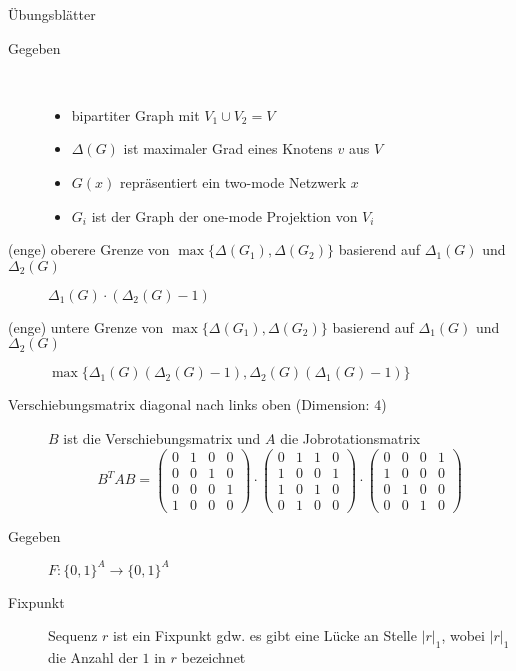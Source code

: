 \begin{TOP}{Übungsblätter}
		\begin{description}
			\item[Gegeben] \ \\\vspace*{-\baselineskip}
				\begin{itemize}
					\item bipartiter Graph mit $V_1\cup V_2=V$
					\item $\Delta(G)$ ist maximaler Grad eines Knotens $v$ aus $V$
					\item $G(x)$ repräsentiert ein two-mode Netzwerk $x$
					\item $G_i$ ist der Graph der one-mode Projektion von $V_i$
				\end{itemize}
			\item[(enge) oberere Grenze von $\max\{\Delta(G_1),\Delta(G_2)\}$ basierend auf $\Delta_1(G)$ und $\Delta_2(G)$] $\Delta_1(G)\cdot (\Delta_2(G)-1)$
			\item[(enge) untere Grenze von $\max\{\Delta(G_1),\Delta(G_2)\}$ basierend auf $\Delta_1(G)$ und $\Delta_2(G)$] $\max\{\Delta_1(G)(\Delta_2(G)-1), \Delta_2(G)(\Delta_1(G)-1)\}$
		\end{description}
		\begin{description}
			\item[Verschiebungsmatrix diagonal nach links oben (Dimension: $4$)] $B$ ist die Verschiebungsmatrix und $A$ die Jobrotationsmatrix
				\[B^TAB=\left(\begin{array}{cccc}
					0&1&0&0\\
					0&0&1&0\\
					0&0&0&1\\
					1&0&0&0
				\end{array}\right)\cdot\left(\begin{array}{cccc}
					0&1&1&0\\
					1&0&0&1\\
					1&0&1&0\\
					0&1&0&0
				\end{array}\right)\cdot \left(\begin{array}{cccc}
					0&0&0&1\\
					1&0&0&0\\
					0&1&0&0\\
					0&0&1&0
				\end{array}\right)\]
		\end{description}
		\begin{description}
			\item[Gegeben] $F: \{0,1\}^A \rightarrow \{0,1\}^A$
			\item[Fixpunkt] Sequenz $r$ ist ein Fixpunkt gdw. es gibt eine Lücke an Stelle $|r|_1$, wobei $|r|_1$ die Anzahl der $1$ in $r$ bezeichnet
		\end{description}
\end{TOP}